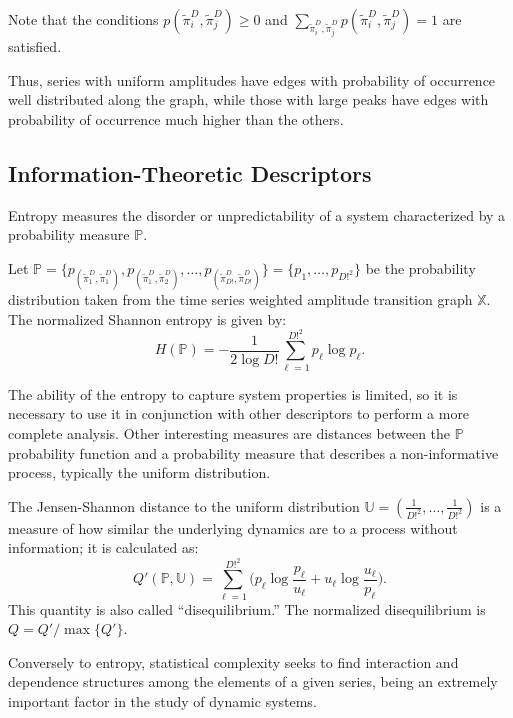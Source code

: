 \documentclass[journal]{IEEEtran}
\begin{document}
Note that the conditions $p(\widetilde\pi^D_i, \widetilde\pi^D_j) \ge 0$ and $\sum_{\widetilde\pi^D_i, \widetilde\pi^D_j} p(\widetilde\pi^D_i, \widetilde\pi^D_j) = 1$ are satisfied.

Thus, series with uniform amplitudes have edges with probability of occurrence well distributed along the graph, while those with large peaks have edges with probability of occurrence much higher than the others.

\subsection{Information-Theoretic Descriptors}\label{HC}

Entropy measures the disorder or unpredictability of a system characterized by a probability measure $\mathbb{P}$.

Let $\mathbb{P} = \{p_{(\widetilde\pi^D_1, \widetilde\pi^D_1)}, p_{(\widetilde\pi^D_1, \widetilde\pi^D_2)}, \dots, p_{(\widetilde\pi^D_{D!}, \widetilde\pi^D_{D!})} \} = \{p_1,\dots,p_{D!^2}\}$ be the probability distribution taken from the time series weighted amplitude transition graph $\mathbb{X}$.
The normalized Shannon entropy is given by:	
\begin{equation}
H(\mathbb{P}) = -\frac1{2\log D!}\sum_{\ell=1}^{D!^2} p_{\ell} \log p_{\ell} .
\label{eq:Entropia}
\end{equation}

The ability of the entropy to capture system properties is limited, so it is necessary to use it in conjunction with other des\-criptors to perform a more complete analysis.
Other interesting measures are distances between the $\mathbb{P}$ probability function and a probability measure that describes a non-informative process, typically the uniform distribution.

The Jensen-Shannon distance to the uniform distribution $\mathbb{U} = (\frac{1}{D!^2}, \dots, \frac{1}{D!^2})$ is a measure of how similar the underlying dynamics are to a process without information; it is calculated as:
\begin{equation}
Q'(\mathbb{P}, \mathbb{U}) = \sum_{\ell=1}^{D!^2} \Big(p_\ell \log\frac{p_\ell}{u_\ell} +
u_\ell \log\frac{u_\ell}{p_\ell}
\Big).
\end{equation}
This quantity is also called ``disequilibrium.''
The normalized disequilibrium is $ Q=Q'/\max\{Q'\}$.

Conversely to entropy, statistical complexity seeks to find interaction and dependence structures among the elements of a given series, being an extremely important factor in the study of dynamic systems.
\end{document}
